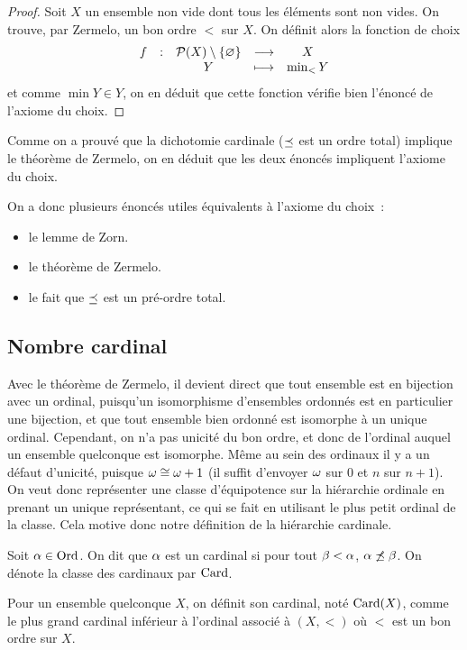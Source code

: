 \begin{proof}
  Soit $X$ un ensemble non vide dont tous les éléments sont non vides.
  On trouve, par Zermelo, un bon ordre $<$ sur $X$. On définit alors la
  fonction de choix
  \[\makeFun{f}{\powerset(X)\setminus\{\vide\}}{X}{Y}{\min_{<} Y}\]
  et comme $\min Y\in Y$, on en déduit que cette fonction vérifie bien l'énoncé
  de l'axiome du choix.
\end{proof}

Comme on a prouvé que la dichotomie cardinale ($\preceq$ est un ordre total)
implique le théorème de Zermelo, on en déduit que les deux énoncés impliquent
l'axiome du choix.

On a donc plusieurs énoncés utiles équivalents à l'axiome du choix~:
\begin{itemize}
\item le lemme de Zorn.
\item le théorème de Zermelo.
\item le fait que $\preceq$ est un pré-ordre total.
\end{itemize}

\subsection{Nombre cardinal}

Avec le théorème de Zermelo, il devient direct que tout ensemble est en
bijection avec un ordinal, puisqu'un isomorphisme d'ensembles ordonnés est en
particulier une bijection, et que tout ensemble bien ordonné est isomorphe à
un unique ordinal. Cependant, on n'a pas unicité du bon ordre, et donc de
l'ordinal auquel un ensemble quelconque est isomorphe. Même au sein des ordinaux
il y a un défaut d'unicité, puisque $\omega \cong \omega + 1$ (il suffit d'envoyer
$\omega$ sur $0$ et $n$ sur $n + 1$). On veut donc représenter une classe
d'équipotence sur la hiérarchie ordinale en prenant un unique représentant, ce
qui se fait en utilisant le plus petit ordinal de la classe. Cela motive donc
notre définition de la hiérarchie cardinale.

\begin{definition}[Cardinal]
  Soit $\alpha \in \operatorname{Ord}$. On dit que $\alpha$ est un cardinal si pour tout
  $\beta < \alpha$, $\alpha\not\preceq\beta$. On dénote la classe des cardinaux
  par $\operatorname{Card}$.

  Pour un ensemble quelconque $X$, on définit son cardinal, noté $\operatorname{Card}(X)$,
  comme le plus grand cardinal inférieur à l'ordinal associé à $(X,<)$ où $<$
  est un bon ordre sur $X$.
\end{definition}

